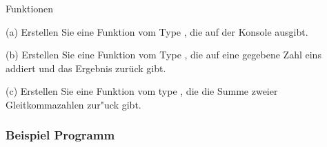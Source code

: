 \begin{frame}[t]%
\begin{exercise}{Funktionen}
\begin{body}
\medskip
\begin{parts}
\item[(a)] Erstellen Sie eine Funktion vom Type , die  auf der Konsole ausgibt.
\item[(b)] Erstellen Sie eine Funktion vom Type , die auf eine gegebene Zahl eins addiert und das Ergebnis zur\"uck gibt.
\item[(c)] Erstellen Sie eine Funktion vom type , die die Summe zweier Gleitkommazahlen zur"uck gibt.
\end{parts}
\end{body}
\end{exercise}
\end{frame}

\begin{frame}[fragile]%
  \frametitle{Beispiel Programm}%
\medskip


\end{frame}
